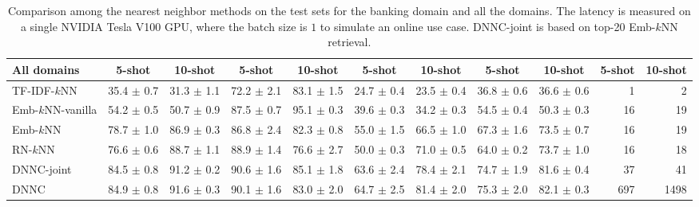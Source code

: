 \begin{table}[]
{\begin{tabular}{l|cc|cc|cc|cc|rr}
\textbf{All domains} & \textbf{5-shot}                & \textbf{10-shot} & \textbf{5-shot}    & \textbf{10-shot}    & \textbf{5-shot}         & \textbf{10-shot}        & \textbf{5-shot}  & \textbf{10-shot} & \textbf{5-shot}   & \textbf{10-shot}  \\ \hline
TF-IDF-$k$NN               & 35.4 $\pm$ 0.7                 & 31.3 $\pm$ 1.1   & 72.2 $\pm$ 2.1     & 83.1 $\pm$ 1.5      & 24.7 $\pm$ 0.4          & 23.5 $\pm$ 0.4          &     36.8 $\pm$    0.6          &   36.6 $\pm$ 0.6              & 1             & 2             \\
Emb-$k$NN-vanilla           &  54.2 $\pm$ 0.5              &  50.7 $\pm$ 0.9 &   87.5 $\pm$ 0.7  &   95.1 $\pm$ 0.3  &  39.6 $\pm$ 0.3       &  34.2 $\pm$ 0.3    & 54.5 $\pm$ 0.4 & 50.3 $\pm$ 0.3  &   16        &     19         \\
Emb-$k$NN            &         78.7 $\pm$ 1.0                       &     86.9  $\pm$ 0.3            &     86.8 $\pm$ 2.4               &   82.3 $\pm$ 0.8                 &           55.0 $\pm$ 1.5              &      66.5 $\pm$ 1.0                   &        67.3 $\pm$ 1.6          &       73.5 $\pm$ 0.7          &         16          &     19              \\
RN-$k$NN             &    76.6 $\pm$ 0.6      &      88.7  $\pm$ 1.1        &    88.9 $\pm$ 1.4                &     76.6 $\pm$ 2.7               &   50.0 $\pm$ 0.3                       &      71.0 $\pm$ 0.5                  &           64.0   $\pm$ 0.2     &       73.7 $\pm$ 1.0         &     16              &    18               \\ \hdashline
DNNC-joint   & 84.5 $\pm$ 0.8 & 91.2 $\pm$ 0.2   & 90.6 $\pm$ 1.6     & 85.1 $\pm$ 1.8      & 63.6 $\pm$ 2.4          & 78.4 $\pm$ 2.1          &        74.7  $\pm$ 1.9         &     81.6 $\pm$ 0.4             & 37             & 41             \\ 
DNNC        & 84.9 $\pm$ 0.8                 & 91.6 $\pm$ 0.3   & 90.1 $\pm$ 1.6     & 83.0 $\pm$ 2.0      & 64.7 $\pm$ 2.5          & 81.4 $\pm$ 2.0          &            75.3 $\pm$ 2.0       &   82.1 $\pm$ 0.3                        & 697             & 1498             \\ \hline
\end{tabular}}\caption{Comparison among the nearest neighbor methods on the test sets for the banking domain and all the domains. The latency is measured on a single NVIDIA Tesla V100 GPU, where the batch size is $1$ to simulate an online use case. DNNC-joint is based on top-20 Emb-$k$NN retrieval. }
\label{table:latency}
\end{table}



